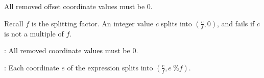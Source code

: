 \filbreak
{} All removed offset coordinate values must be 0.

\filbreak
{} Recall $f$ is the splitting factor. An integer value $c$ splits into $(\frac{c}{f}, 0)$, and fails if $c$ is not a multiple of $f$.

\filbreak
{}: All removed coordinate values must be 0.

\filbreak
{}: Each coordinate $e$ of the expression splits into $(\frac{e}{f}, e~\%f)$.


